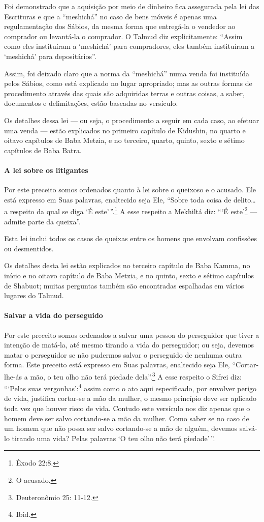 Foi demonstrado que a aquisição por meio de dinheiro fica assegurada
pela lei das Escrituras e que a ``meshichá'' no caso de bens móveis é
apenas uma regulamentação dos Sábios, da mesma forma que entregá-la o
vendedor ao comprador ou levantá-la o comprador. O Talmud diz
explicitamente: ``Assim como eles instituíram a `meshichá' para
compradores, eles também instituíram a `meshichá' para depositários''.

Assim, foi deixado claro que a norma da ``meshichá'' numa venda foi
instituída pelos Sábios, como está explicado no lugar apropriado; mas as
outras formas de procedimento através das quais são adquiridas terras e
outras coisas, a saber, documentos e delimitações, estão baseadas no
versículo.

Os detalhes dessa lei --- ou seja, o procedimento a seguir em cada caso,
ao efetuar uma venda --- estão explicados no primeiro capítulo de
Kidushin, no quarto e oitavo capítulos de Baba Metzia, e no terceiro,
quarto, quinto, sexto e sétimo capítulos de Baba Batra.

\paragraph{A lei sobre os litigantes}

Por este preceito somos ordenados quanto à lei sobre o queixoso
e o acusado. Ele está expresso em Suas palavras, enaltecido seja Ele,
``Sobre toda coisa de delito\ldots{} a respeito da qual se diga `É este'\,''.\footnote{Êxodo 22:8.} A esse respeito a Mekhiltá diz: ```É
este'\footnote{O acusado.} --- admite parte da queixa''.

Esta lei inclui todos os casos de queixas entre os homens que envolvam
confissões ou desmentidos.

Os detalhes desta lei estão explicados no terceiro capítulo de Baba
Kamma, no início e no oitavo capítulo de Baba Metzia, e no quinto, sexto
e sétimo capítulos de Shabuot; muitas perguntas também são encontradas
espalhadas em vários lugares do Talmud.

\paragraph{Salvar a vida do perseguido}

Por este preceito somos ordenados a salvar uma pessoa do perseguidor
que tiver a intenção de matá-la, até mesmo tirando a vida do
perseguidor; ou seja, devemos matar o perseguidor se não pudermos salvar
o perseguido de nenhuma outra forma. Este preceito está expresso em Suas
palavras, enaltecido seja Ele, ``Cortar-lhe-ás a mão, o teu olho não
terá piedade dela''.\footnote{Deuteronômio 25: 11-12.} A esse respeito o Sifrei
diz: ```Pelas suas vergonhas':\footnote{Ibid.} assim como o ato aqui
especificado, por envolver perigo de vida, justifica cortar-se a mão da
mulher, o mesmo princípio deve ser aplicado toda vez que houver risco de
vida. Contudo este versículo nos diz apenas que o homem deve ser salvo
cortando-se a mão da mulher. Como saber se no caso de um homem que não
possa ser salvo cortando-se a mão de alguém, devemos salvá-lo tirando
uma vida? Pelas palavras `O teu olho não terá piedade'\,''.

